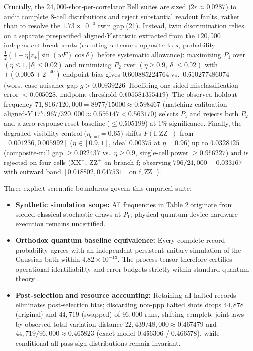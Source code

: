 \documentclass[11pt,letterpaper]{article}
\theoremstyle{definition}
\providecommand{\tightlist}{\setlength{\itemsep}{2pt}\setlength{\parskip}{0pt}}
\begin{document}
Crucially, the \(24{,}000\)-shot-per-correlator Bell suites are sized
(\(2r \approx 0.0287\)) to audit complete 8-cell distributions and
reject substantial readout faults, rather than to resolve the
\(1.73 \times 10^{-3}\) twin gap (21). Instead, twin discrimination
relies on a separate prespecified aligned-\(Y\) statistic extracted from
the \(120{,}000\) independent-break shots (counting outcomes opposite to
\(s\), probability \(\frac{1}{2}(1 + \eta|z_\pm|\sin(wF)\cos\delta)\)
before systematic allowance): maximizing \(P_1\) over
\((\eta \le 1, |\delta| \le 0.02)\) and minimizing \(P_2\) over
\((\eta \ge 0.9, |\delta| \le 0.02)\) with \(\pm(0.0005 + 2^{-40})\)
endpoint bias gives \(0.600885224764\) vs.~\(0.610277486074\)
(worst-case nuisance gap \(g > 0.00939226\), Hoeffding one-sided
misclassification error \(< 0.005028\), midpoint threshold
\(0.605581355419\)). The observed holdout frequency
\(71{,}816/120{,}000 = 8977/15000 \approx 0.598467\) (matching
calibration aligned-\(Y\)
\(177{,}967/320{,}000 \approx 0.556147 < 0.563170\)) selects \(P_1\) and
rejects both \(P_2\) and a zero-response reset baseline
(\(\le 0.505199\)) at \(1\%\) significance. Finally, the
degraded-visibility control (\(\eta_{\mathrm{chal}} = 0.65\)) shifts
\(P(\mathrm{f}, \mathrm{ZZ}^-)\) from \([0.001236, 0.005992]\)
(\(\eta \in [0.9, 1]\), ideal \(0.00375\) at \(\eta=0.96\)) up to
\(0.0328125\) (composite-null gap \(\ge 0.022437\) vs.~\(\eta \ge 0.9\),
single-cell power \(\ge 0.956227\)) and is rejected on four cells
(\(\mathrm{XX}^\pm\), \(\mathrm{ZZ}^\pm\) on branch \(\mathrm{f}\);
observing \(796/24{,}000 = 0.033167\) with outward band
\([0.018802, 0.047531]\) on \(\mathrm{f},\mathrm{ZZ}^-\)).

Three explicit scientific boundaries govern this empirical suite:

\begin{itemize}
\tightlist
\item
  \textbf{Synthetic simulation scope:} All frequencies in Table 2
  originate from seeded classical stochastic draws at \(P_1\); physical
  quantum-device hardware execution remains uncertified.
\item
  \textbf{Orthodox quantum baseline equivalence:} Every complete-record
  probability agrees with an independent persistent unitary simulation
  of the Gaussian bath within \(4.82 \times 10^{-13}\). The process
  tensor therefore certifies operational identifiability and error
  budgets strictly within standard quantum theory
  \citep{masanes2019, renou2021}.
\item
  \textbf{Post-selection and resource accounting:} Retaining all halted
  records eliminates post-selection bias; discarding
  non-\(\mathrm{ppp}\) halted shots drops \(44{,}878\) (original) and
  \(44{,}719\) (swapped) of \(96{,}000\) runs, shifting complete joint
  laws by observed total-variation distance
  \(22{,}439/48{,}000 \approx 0.467479\) and
  \(44{,}719/96{,}000 \approx 0.465823\) (exact model \(0.466306\) /
  \(0.466578\)), while conditional all-pass sign distributions remain
  invariant.
\end{itemize}
\end{document}
